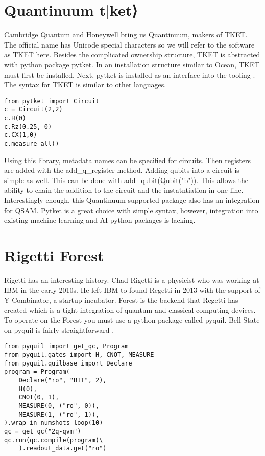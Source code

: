 \documentclass[conference]{IEEEtran}
\begin{document}
\section{Quantinuum t$|$ket⟩}
Cambridge Quantum and Honeywell bring us Quantinuum, makers of TKET. 
The official name has Unicode special characters so we will refer to the software as TKET here.
Besides the complicated ownership structure, TKET is abstracted with python package pytket.
In an installation structure similar to Ocean, TKET must first be installed. 
Next, pytket is installed as an interface into the tooling \cite{b11}.
The syntax for TKET is similar to other languages.
\begin{verbatim}
from pytket import Circuit
c = Circuit(2,2)
c.H(0)
c.Rz(0.25, 0)
c.CX(1,0)
c.measure_all()
\end{verbatim}
Using this library, metadata names can be specified for circuits.
Then registers are added with the add\_q\_register method.
Adding qubits into a circuit is simple as well. 
This can be done with add\_qubit(Qubit("b")).
This allows the ability to chain the addition to the circuit and the instatntiation in one line. 
Interestingly enough, this Quantinuum supported package also has an integration for QSAM.
Pytket is a great choice with simple syntax, however, integration into existing machine learning and AI python packages is lacking.



\section{Rigetti Forest}
Rigetti has an interesting history. 
Chad Rigetti is a physicist who was working at IBM in the early 2010s. 
He left IBM to found Regetti in 2013 with the support of Y Combinator, a startup incubator.
Forest is the backend that Regetti has created which is a tight integration of quantum and classical computing devices.
To operate on the Forest you must use a python package called pyquil. 
Bell State on pyquil is fairly straightforward \cite{b14}.

\begin{verbatim}
from pyquil import get_qc, Program
from pyquil.gates import H, CNOT, MEASURE
from pyquil.quilbase import Declare
program = Program(
    Declare("ro", "BIT", 2),
    H(0),
    CNOT(0, 1),
    MEASURE(0, ("ro", 0)),
    MEASURE(1, ("ro", 1)),
).wrap_in_numshots_loop(10)
qc = get_qc("2q-qvm")
qc.run(qc.compile(program)\
    ).readout_data.get("ro")
\end{verbatim}
\end{document}
